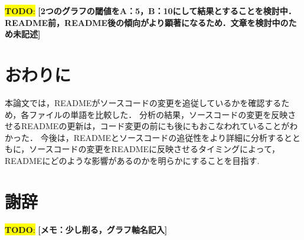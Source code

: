 \documentclass[uplatex,dvipdfmx,a4paper,twocolumn,base=11pt,jbase=11pt,ja=standard]{bxjsarticle}  %
\newcommand{\todo}[1]{\colorbox{yellow}{{\bf TODO}:}{\color{red} {\textbf{[#1]}}}}
\begin{document}
\todo{2つのグラフの閾値をA：5，B：10にして結果とすることを検討中．README前，README後の傾向がより顕著になるため．文章を検討中のため未記述}






\section{おわりに}




本論文では，READMEがソースコードの変更を追従しているかを確認するため，各ファイルの単語を比較した．
分析の結果，ソースコードの変更を反映させるREADMEの更新は，コード変更の前にも後にもおこなわれていることがわかった．
今後は，READMEとソースコードの追従性をより詳細に分析するとともに，ソースコードの変更をREADMEに反映させるタイミングによって，READMEにどのような影響があるのかを明らかにすることを目指す.



\section*{謝辞}




\todo{メモ：少し削る，グラフ軸名記入}




\end{document}
